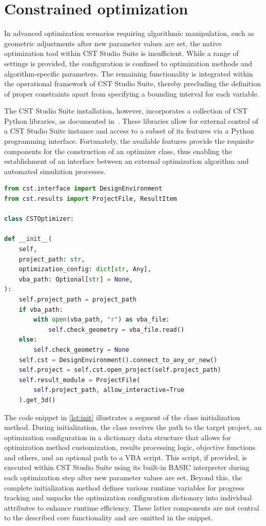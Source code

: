 \documentclass[11pt,a4paper,twoside,openany]{report}
\begin{document}
\appendix
\chapter{Constrained optimization}
\label{appendix:constrained-optimization}
In advanced optimization scenarios requiring algorithmic manipulation, such as geometric adjustments after new parameter values are set, the native optimization tool within CST Studio Suite is insufficient. While a range of settings is provided, the configuration is confined to optimization methods and algorithm-specific parameters. The remaining functionality is integrated within the operational framework of CST Studio Suite, thereby precluding the definition of proper constraints apart from specifying a bounding interval for each variable.

The CST Studio Suite installation, however, incorporates a collection of CST Python libraries, as documented in~\parencite{cst:python-libraries-documentation}. These libraries allow for external control of a CST Studio Suite instance and access to a subset of its features via a Python programming interface.  Fortunately, the available features provide the requisite components for the construction of an optimizer class, thus enabling the establishment of an interface between an external optimization algorithm and automated simulation processes.

\begin{lstlisting}[caption={Optimizer class initialization}, label={lst:init}, language=Python]
from cst.interface import DesignEnvironment
from cst.results import ProjectFile, ResultItem

class CSTOptimizer:

def __init__(
    self,
    project_path: str,
    optimization_config: dict[str, Any],
    vba_path: Optional[str] = None,
):
    self.project_path = project_path
    if vba_path:
        with open(vba_path, "r") as vba_file:
            self.check_geometry = vba_file.read()
    else:
        self.check_geometry = None
    self.cst = DesignEnvironment().connect_to_any_or_new()
    self.project = self.cst.open_project(self.project_path)
    self.result_module = ProjectFile(
        self.project_path, allow_interactive=True
    ).get_3d()
\end{lstlisting}

The code snippet in \cref{lst:init} illustrates a segment of the class initialization method. During initialization, the class receives the path to the target project, an optimization configuration in a dictionary data structure that allows for optimization method customization, results processing logic, objective functions and others, and an optional path to a VBA script. This script, if provided, is executed within CST Studio Suite using its built-in BASIC interpreter during each optimization step after new parameter values are set. Beyond this, the complete initialization method defines various runtime variables for progress tracking and unpacks the optimization configuration dictionary into individual attributes to enhance runtime efficiency. These latter components are not central to the described core functionality and are omitted in the snippet.
\end{document}

